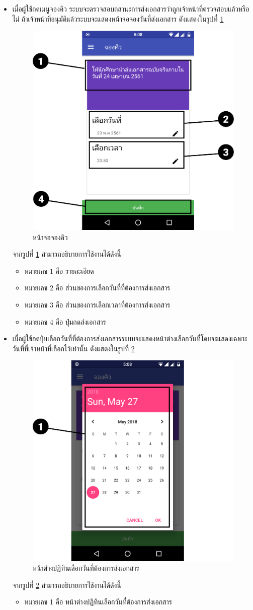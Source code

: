 \begin{enumerate}
\begin{itemize}
			\item เมื่อผู้ใช้กดเมนูจองคิว ระบบจะตรวจสอบถสานะการส่งเอกสารว่าถูกเจ้าหน้าที่ตรวจสอบแล้วหรือไม่ ถ้าเจ้าหน้าที่อนุมัติแล้วระบบจะแสดงหน้าจอจองวันที่ส่งเอกสาร ดังแสดงในรูปที่ \ref{Fig:checkin}
			\begin{figure}[H]
				\centering
				\includegraphics[width=0.5\columnwidth]{Figures/7/Manual/checkin}
				\caption{หน้าจอจองคิว}
				\label{Fig:checkin}
			\end{figure}
			จากรูปที่ \ref{Fig:checkin} สามารถอธิบายการใช้งานได้ดังนี้
			\begin{itemize}[label={--}]
				\item หมายเลข 1 คือ รายละเอียด 
				\item หมายเลข 2 คือ ส่วนของการเลือกวันที่ที่ต้องการส่งเอกสาร
				\item หมายเลข 3 คือ ส่วนของการเลือกเวลาที่ต้องการส่งเอกสาร
				\item หมายเลข 4 คือ ปุ่มกดส่งเอกสาร
			\end{itemize} 
		
			\item เมื่อผู้ใช้กดปุ่มเลือกวันที่ที่ต้องการส่งเอกสารระบบจะแสดงหน้าต่างเลือกวันที่โดยจะแสดงเฉพาะวันที่ที่เจ้าหน้าที่เลือกไว้เท่านั้น ดังแสดงในรูปที่ \ref{Fig:date}
			\begin{figure}[H]
				\centering
				\includegraphics[width=0.5\columnwidth]{Figures/7/Manual/date}
				\caption{หน้าต่างปฏิทินเลือกวันที่ต้องการส่งเอกสาร}
				\label{Fig:date}
			\end{figure}
			จากรูปที่ \ref{Fig:date} สามารถอธิบายการใช้งานได้ดังนี้
			\begin{itemize}[label={--}]
				\item หมายเลข 1 คือ หน้าต่างปฏิทินเลือกวันที่ต้องการส่งเอกสาร 
			\end{itemize}
			

\end{itemize}
\end{enumerate}
